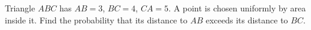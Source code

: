 Triangle $ABC$ has $AB=3$, $BC=4$, $CA=5$. A point is chosen uniformly by area inside it. Find the probability that its distance to $AB$ exceeds its distance to $BC$.
